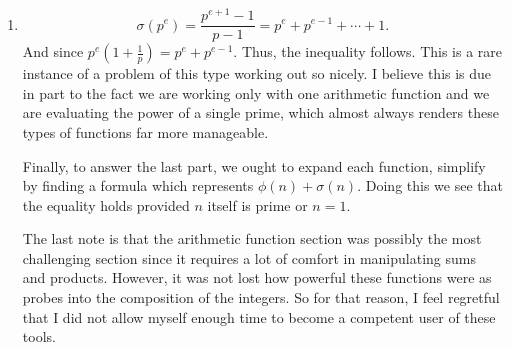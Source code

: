 \documentclass[12pt]{article}
\makeatletter
\theoremstyle{definition}
\theoremstyle{remark}
\newenvironment{solution}[1][\bf{\textit{Solution}}]{\par
  
  \normalfont \topsep6\p@\@plus6\p@\relax
  \list{}{\leftmargin=0mm
          \rightmargin=4mm
          \settowidth{\itemindent}{\itshape#1}%
          \labelwidth=\itemindent
          \parsep=0pt \listparindent=\parindent 
  }
  \item[\hskip\labelsep
        \itshape
    #1\@addpunct{.}]\ignorespaces
}{%
  \popQED\endlist\@endpefalse
}
\makeatother
\begin{document}
\begin{enumerate}[leftmargin=*]
\begin{solution}
                    \begin{equation*}
                        \sigma(p^e)=\frac{p^{e+1}-1}{p-1}=p^e+p^{e-1}+\cdots+1.
                    \end{equation*}
                And since $p^e(1+\frac{1}{p})=p^e+p^{e-1}$. Thus, the inequality follows. This is a rare instance of a problem of this type working out so nicely. I believe this is due in part to the fact we are working only with one arithmetic function and we are evaluating the power of a single prime, which almost always renders these types of functions far more manageable.\par\hspace{4mm} Finally, to answer the last part, we ought to expand each function, simplify by finding a formula which represents $\phi(n)+\sigma(n)$. Doing this we see that the equality holds provided $n$ itself is prime or $n=1$. \par\hspace{4mm} The last note is that the arithmetic function section was possibly the most challenging section since it requires a lot of comfort in manipulating sums and products. However, it was not lost how powerful these functions were as probes into the composition of the integers. So for that reason, I feel regretful that I did not allow myself enough time to become a competent user of these tools. 
            \end{solution}
    \end{enumerate}
\end{document}
